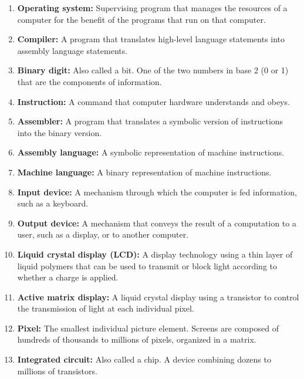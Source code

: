 \begin{enumerate}
    \item \textbf{Operating system:} Supervising program that manages the resources of a computer for the benefit of the programs that run on that computer.
    
    \item \textbf{Compiler:} A program that translates high-level language statements into assembly language statements.
    
    \item \textbf{Binary digit:} Also called a bit. One of the two numbers in base 2 (0 or 1) that are the components of information.
    
    \item \textbf{Instruction:} A command that computer hardware understands and obeys.
    
    \item \textbf{Assembler:} A program that translates a symbolic version of instructions into the binary version.
    
    \item \textbf{Assembly language:} A symbolic representation of machine instructions.
    
    \item \textbf{Machine language:} A binary representation of machine instructions.
    
    \item \textbf{Input device:} A mechanism through which the computer is fed information, such as a keyboard.
    
    \item \textbf{Output device:} A mechanism that conveys the result of a computation to a user, such as a display, or to another computer.
    
    \item \textbf{Liquid crystal display (LCD):} A display technology using a thin layer of liquid polymers that can be used to transmit or block light according to whether a charge is applied.
    
    \item \textbf{Active matrix display:} A liquid crystal display using a transistor to control the transmission of light at each individual pixel.
    
    \item \textbf{Pixel:} The smallest individual picture element. Screens are composed of hundreds of thousands to millions of pixels, organized in a matrix.
    
    \item \textbf{Integrated circuit:} Also called a chip. A device combining dozens to millions of transistors.
    

\end{enumerate}
